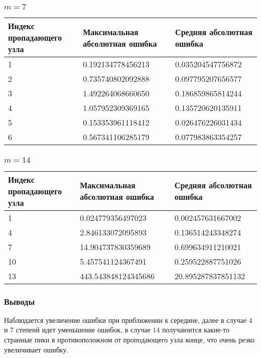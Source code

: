 \documentclass[paper=a4, fontsize=11pt]{scrartcl} %
\numberwithin{equation}{section} %
\numberwithin{figure}{section} %
\numberwithin{table}{section} %
\begin{document}
\subsubsection{$m=7$}

\begin{tabular}{|p{4 cm}|p{4 cm}|p{4 cm}|}
\hline
	Индекс пропадающего узла & Максимальная абсолютная ошибка & Средняя абсолютная ошибка\\
\hline
	1 & 0.192134778456213 & 0.035204547756872\\
\hline
	2 & 0.735740802092888 & 0.097795207656577\\
\hline
	3 & 1.492264068660650 & 0.186859865814244\\
\hline
	4 & 1.057952309369165 & 0.135720620135911\\
\hline
	5 & 0.153353961118412 & 0.026476226031434\\
\hline
	6 & 0.567341106285179 & 0.077983863354257\\
\hline
\end{tabular}

\subsubsection{$m=14$}

\begin{tabular}{|p{4 cm}|p{4 cm}|p{4 cm}|}
\hline
	Индекс пропадающего узла & Максимальная абсолютная ошибка & Средняя абсолютная ошибка\\
\hline
	1 & 0.024779356497023 & 0.002457631667002\\
\hline
	4 & 2.846133072095893 & 0.136514243348274\\
\hline
	7 & 14.904737830359689 & 0.699634911210021\\
\hline
	10 & 5.457541124367491 & 0.259522887751026\\
\hline
	13 & 443.543848124345686 & 20.895287837851132\\
\hline
\end{tabular}

\subsubsection{Выводы}

Наблюдается увеличение ошибки при приближении к середине, далее в случае $4$ и $7$ степенй идет уменьшение ошибок, в случае $14$ получаюится какие-то странные пики в противоположном от проподающего узла конце, что очень резко увеличивает ошибку.
\end{document}
